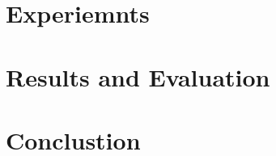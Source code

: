 \documentclass{article}
\begin{document}
\lipsum[1] %

\section{Experiemnts}
\label{sec:exps}

\lipsum[1] %

\section{Results and Evaluation}
\label{sec:results}

\lipsum[1] %

\section{Conclustion}
\label{sec:conc}

\lipsum[1] %


\end{document}
